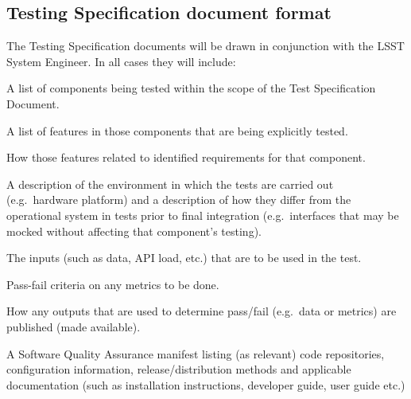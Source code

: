 \subsection{Testing Specification document format}\label{sect:tsform}

The Testing Specification documents will be drawn in conjunction with the LSST System Engineer. In all cases they will include:

\begin{itemize_single}

\item A list of components being tested within the scope of the Test Specification Document.

\item A list of features in those components that are being explicitly tested.

\item How those features related to identified requirements for that component.

\item A description of the environment in which the tests are carried out (e.g.\ hardware platform) and a description of how they differ from the operational system in tests prior to final integration (e.g.\ interfaces that may be mocked without affecting that component's testing).

\item The inputs (such as data, API load, etc.) that are to be used in the test.

\item Pass-fail criteria on any metrics to be done.

\item How any outputs that are used to determine pass/fail (e.g.\ data or metrics) are published (made available).

\item A Software Quality Assurance manifest listing (as relevant) code repositories, configuration information, release/distribution methods and applicable documentation (such as installation instructions, developer guide, user guide etc.)

\end{itemize_single}
